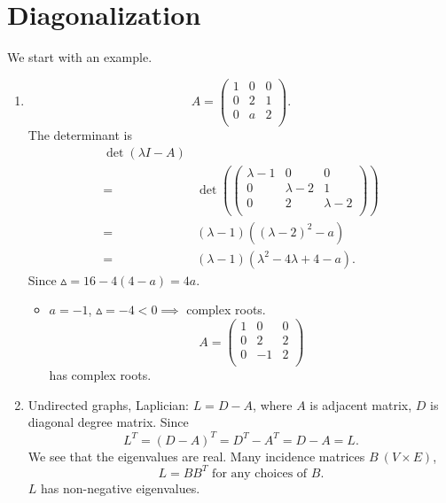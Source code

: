 \section{Diagonalization}
\begin{eg}
	We start with an example.
	\begin{enumerate}
		\item \[
			      A = \begin{pmatrix}
				      1 & 0 & 0 \\
				      0 & 2 & 1 \\
				      0 & a & 2 \\
			      \end{pmatrix}.
		      \]
		      The determinant is
		      \[
			      \begin{split}
				      \det(\lambda I - A)\\
				      =& \det \left(  \begin{pmatrix}
					      \lambda - 1 & 0            & 0             \\
					      0           & \lambda -  2 & 1             \\
					      0           & 2            & \lambda -   2 \\
				      \end{pmatrix}\right) \\
				      =& (\lambda - 1)((\lambda - 2 )^2 - a)\\
				      =& (\lambda - 1)(\lambda^2 - 4\lambda + 4 - a).
			      \end{split}
		      \]
		      Since \(\vartriangle = 16 - 4(4-a) = 4a\).
		      \begin{itemize}
			      \item \(a = -1\), \(\vartriangle = -4 < 0 \implies\) complex roots.
			            \[
				            A = \begin{pmatrix}
					            1 & 0  & 0 \\
					            0 & 2  & 2 \\
					            0 & -1 & 2 \\
				            \end{pmatrix}
			            \] has complex roots.
		      \end{itemize}
		\item Undirected graphs, Laplician: \(L = D - A\), where \(A\) is adjacent matrix, \(D\) is diagonal degree matrix.
		      Since \[
			      L^{T} = (D - A)^{T} = D^{T} - A^{T} = D - A = L.
		      \] We see that the eigenvalues are real. Many incidence matrices \(B\ (V\times  E)\),
		      \[
			      L = BB^{T} \text{ for any choices of }B.
		      \]
		      \(L\) has non-negative eigenvalues.
	\end{enumerate}
\end{eg}

